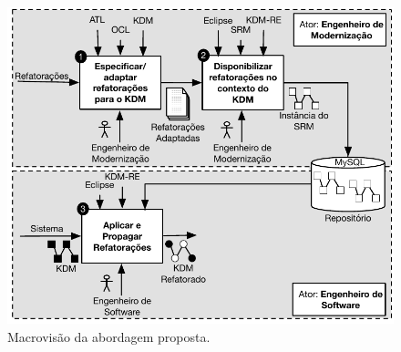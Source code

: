 
\begin{figure}[h]
	\centering
	\caption{Macrovisão da abordagem proposta.}
	\label{fig:abordagem_kdm_tese_processo}
	\includegraphics[scale=0.8]{images/ImagemIntroducaoAbordagemNova}
	\fautor
\end{figure}

